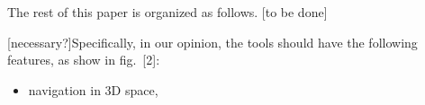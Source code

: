 \documentclass[letterpaper, 10 pt, conference]{ieeeconf}  %
\begin{document}
The rest of this paper is organized as follows. [to be done]

[necessary?]Specifically, in our opinion, the tools should have the following features, as show in fig.~[2]:
\begin{itemize}
	\item navigation in 3D space, 
\end{itemize}

\end{document}

